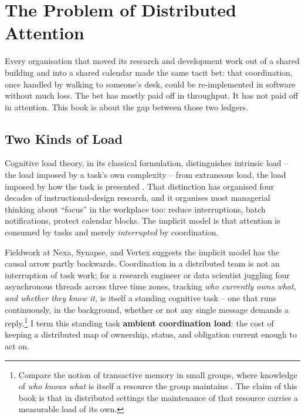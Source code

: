 \chapter{The Problem of Distributed Attention}
\label{ch:introduction}

Every organisation that moved its research and development work out of a
shared building and into a shared calendar made the same tacit bet: that
coordination, once handled by walking to someone's desk, could be
re-implemented in software without much loss. The bet has mostly paid off in
throughput. It has not paid off in attention. This book is about the gap
between those two ledgers.

\section{Two Kinds of Load}

Cognitive load theory, in its classical
formulation, distinguishes intrinsic load -- the load imposed by a task's own
complexity -- from extraneous load, the load imposed by how the task is
presented \citep{sweller1988cognitive}. That distinction has organised four
decades of instructional-design research, and it organises most managerial
thinking about ``focus'' in the workplace too: reduce interruptions, batch
notifications, protect calendar blocks. The implicit model is that attention
is consumed by tasks and merely \emph{interrupted} by coordination.

Fieldwork at Nexa, Synapse, and
Vertex suggests the implicit model has the causal arrow
partly backwards. Coordination in a distributed team is not an
interruption of task work; for a research engineer or data scientist
juggling four asynchronous threads across three time zones, tracking
\emph{who currently owns what, and whether they know it,} is itself a
standing cognitive task -- one that runs continuously, in the background,
whether or not any single message demands a reply.\footnote{Compare the
notion of transactive memory in small groups, where knowledge of
\emph{who knows what} is itself a resource the group maintains
\citep{wegner1986transactive}. The claim of this book is that in distributed
settings the maintenance of that resource carries a measurable load of its
own.} I term this standing task \textbf{ambient coordination
load}: the cost of keeping a distributed
map of ownership, status, and obligation current enough to act on.

